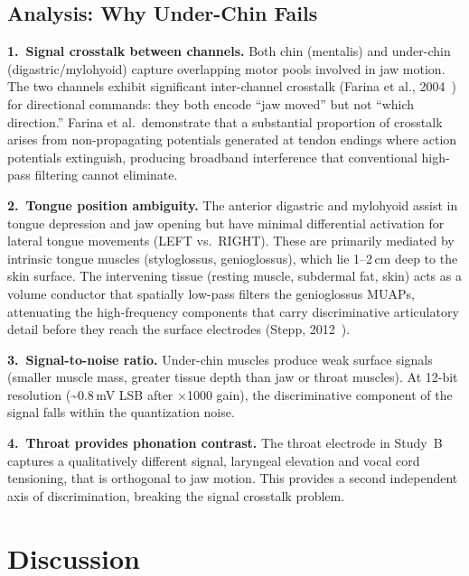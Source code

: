 \documentclass{article}
\begin{document}
\subsection{Analysis: Why Under-Chin Fails}

\textbf{1.\ Signal crosstalk between channels.} Both chin (mentalis) and under-chin (digastric/mylohyoid) capture overlapping motor pools involved in jaw motion. The two channels exhibit significant inter-channel crosstalk (Farina et al., 2004~\cite{farina2014}) for directional commands: they both encode ``jaw moved'' but not ``which direction.'' Farina et al.\ demonstrate that a substantial proportion of crosstalk arises from non-propagating potentials generated at tendon endings where action potentials extinguish, producing broadband interference that conventional high-pass filtering cannot eliminate.

\textbf{2.\ Tongue position ambiguity.} The anterior digastric and mylohyoid assist in tongue depression and jaw opening but have minimal differential activation for lateral tongue movements (LEFT vs.\ RIGHT). These are primarily mediated by intrinsic tongue muscles (styloglossus, genioglossus), which lie 1--2\,cm deep to the skin surface. The intervening tissue (resting muscle, subdermal fat, skin) acts as a volume conductor that spatially low-pass filters the genioglossus MUAPs, attenuating the high-frequency components that carry discriminative articulatory detail before they reach the surface electrodes (Stepp, 2012~\cite{stepp2012}).

\textbf{3.\ Signal-to-noise ratio.} Under-chin muscles produce weak surface signals (smaller muscle mass, greater tissue depth than jaw or throat muscles). At 12-bit resolution (\textasciitilde0.8\,mV LSB after $\times$1000 gain), the discriminative component of the signal falls within the quantization noise.

\textbf{4.\ Throat provides phonation contrast.} The throat electrode in Study~B captures a qualitatively different signal, laryngeal elevation and vocal cord tensioning, that is orthogonal to jaw motion. This provides a second independent axis of discrimination, breaking the signal crosstalk problem.

\section{Discussion}
\end{document}

